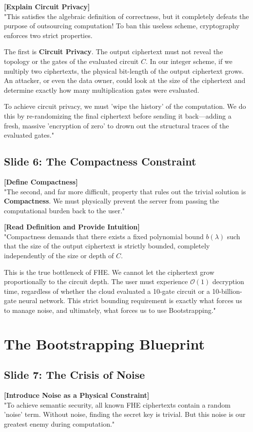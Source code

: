 \documentclass[11pt]{article}
\begin{document}
\textbf{[Explain Circuit Privacy]} \\
"This satisfies the algebraic definition of correctness, but it completely defeats the purpose of outsourcing computation! To ban this useless scheme, cryptography enforces two strict properties. 

The first is \textbf{Circuit Privacy}. The output ciphertext must not reveal the topology or the gates of the evaluated circuit $C$. In our integer scheme, if we multiply two ciphertexts, the physical bit-length of the output ciphertext grows. An attacker, or even the data owner, could look at the size of the ciphertext and determine exactly how many multiplication gates were evaluated. 

To achieve circuit privacy, we must 'wipe the history' of the computation. We do this by re-randomizing the final ciphertext before sending it back---adding a fresh, massive 'encryption of zero' to drown out the structural traces of the evaluated gates."

\subsection*{Slide 6: The Compactness Constraint}
\textbf{[Define Compactness]} \\
"The second, and far more difficult, property that rules out the trivial solution is \textbf{Compactness}. We must physically prevent the server from passing the computational burden back to the user."

\textbf{[Read Definition and Provide Intuition]} \\
"Compactness demands that there exists a fixed polynomial bound $b(\lambda)$ such that the size of the output ciphertext is strictly bounded, completely independently of the size or depth of $C$. 

This is the true bottleneck of FHE. We cannot let the ciphertext grow proportionally to the circuit depth. The user must experience $\mathcal{O}(1)$ decryption time, regardless of whether the cloud evaluated a 10-gate circuit or a 10-billion-gate neural network. This strict bounding requirement is exactly what forces us to manage noise, and ultimately, what forces us to use Bootstrapping."

\section{The Bootstrapping Blueprint}

\subsection*{Slide 7: The Crisis of Noise}
\textbf{[Introduce Noise as a Physical Constraint]} \\
"To achieve semantic security, all known FHE ciphertexts contain a random 'noise' term. Without noise, finding the secret key is trivial. But this noise is our greatest enemy during computation."
\end{document}
